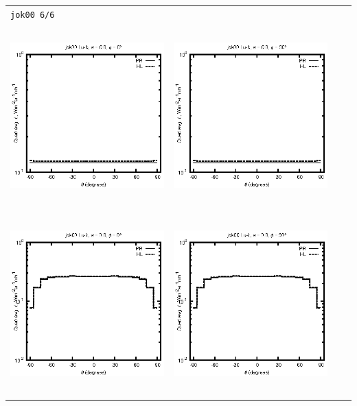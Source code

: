 \begin{tabular}{c c c c}
\multicolumn{4}{l}{\texttt{jok00 6/6}} \\
\includegraphics[height=7cm]{../eps/jok00_Lu_b_fwd.eps} &
\includegraphics[height=7cm]{../eps/jok00_Lu_b_cross.eps} \\
\includegraphics[height=7cm]{../eps/jok00_Lu_it_fwd.eps} &
\includegraphics[height=7cm]{../eps/jok00_Lu_it_cross.eps} \\

\end{tabular}
